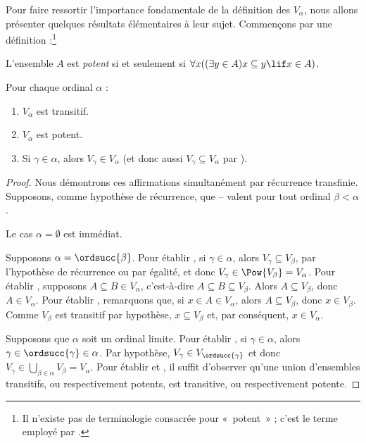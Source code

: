 \documentclass[../../../include/open-logic-section]{subfiles}
\begin{document}

Pour faire ressortir l'importance fondamentale de la définition des
$V_\alpha$, nous allons présenter quelques résultats élémentaires à
leur sujet. Commençons par une définition :\footnote{Il n'existe pas
de terminologie consacrée pour «~potent~» ; c'est le terme employé
par \citet{ButtonLT1}.}
\begin{defn}
L'ensemble $A$ est \emph{potent} si et seulement si
$\forall x((\exists y \in A)x \subseteq y \lif x \in A)$.
\end{defn}
\begin{lem}
Pour chaque ordinal $\alpha$ :
\begin{enumerate}
	\item{} $V_\alpha$ est transitif.
	\item{} $V_\alpha$ est potent.
	\item{} Si $\gamma \in \alpha$, alors
	$V_\gamma \in V_\alpha$ (et donc aussi
	$V_\gamma \subseteq V_\alpha$ par ).
\end{enumerate}
\end{lem}

\begin{proof}
Nous démontrons ces affirmations simultanément par récurrence
transfinie. Supposons, comme hypothèse de récurrence, que
-- valent pour tout ordinal
$\beta < \alpha$.

Le cas $\alpha = \emptyset$ est immédiat.

Supposons $\alpha = \ordsucc{\beta}$. Pour établir
, si $\gamma \in \alpha$, alors
$V_\gamma \subseteq V_\beta$,
par l'hypothèse de récurrence
ou par égalité,
et donc
$V_\gamma \in \Pow{V_\beta} = V_\alpha$. Pour établir
, supposons $A \subseteq B \in V_\alpha$,
c'est-à-dire $A \subseteq B \subseteq V_\beta$. Alors
$A \subseteq V_\beta$, donc $A \in V_\alpha$. Pour établir
, remarquons que, si $x \in A \in V_\alpha$,
alors $A \subseteq V_\beta$, donc $x \in V_\beta$. Comme
$V_\beta$ est transitif par hypothèse, $x \subseteq V_\beta$ et,
par conséquent, $x \in V_\alpha$.

Supposons que $\alpha$ soit un ordinal limite. Pour établir
, si $\gamma \in \alpha$, alors
$\gamma \in \ordsucc{\gamma} \in \alpha$. Par hypothèse,
$V_\gamma \in V_{\ordsucc{\gamma}}$ et donc
$V_\gamma \in \bigcup_{\beta \in \alpha} V_\beta = V_\alpha$.
Pour établir  et , il suffit
d'observer qu'une union d'ensembles transitifs, ou respectivement
potents, est transitive, ou respectivement potente.
\end{proof}
\end{document}
